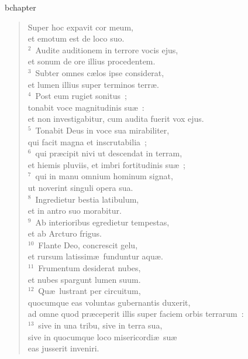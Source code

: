 bchapter\begin{flushleft}\begin{verse}\vspace{-19pt}\hspace{6pt}Super hoc expavit cor meum,\\\hspace{6pt} et emotum est de loco suo.\\
${}^{2}$~Audite auditionem in terrore vocis ejus,\\ et sonum de ore illius procedentem.\\
${}^{3}$~Subter omnes c\ae los ipse considerat,\\ et lumen illius super terminos terr\ae .\\
${}^{4}$~Post eum rugiet sonitus~;\\ tonabit voce magnitudinis su\ae~:\\ et non investigabitur, cum audita fuerit vox ejus.\\
${}^{5}$~Tonabit Deus in voce sua mirabiliter,\\ qui facit magna et inscrutabilia~;\\
${}^{6}$~qui pr\ae cipit nivi ut descendat in terram,\\ et hiemis pluviis, et imbri fortitudinis su\ae~;\\
${}^{7}$~qui in manu omnium hominum signat,\\ ut noverint singuli opera sua.\\
${}^{8}$~Ingredietur bestia latibulum,\\ et in antro suo morabitur.\\
${}^{9}$~Ab interioribus egredietur tempestas,\\ et ab Arcturo frigus.\\
${}^{10}$~Flante Deo, concrescit gelu,\\ et rursum latissim\ae\ funduntur aqu\ae .\\
${}^{11}$~Frumentum desiderat nubes,\\ et nubes spargunt lumen suum.\\
${}^{12}$~Qu\ae\ lustrant per circuitum,\\ quocumque eas voluntas gubernantis duxerit,\\ ad omne quod pr\ae ceperit illis super faciem orbis terrarum~:\\
${}^{13}$~sive in una tribu, sive in terra sua,\\ sive in quocumque loco misericordi\ae\ su\ae \\ eas jusserit inveniri.\\

\end{verse}
\end{flushleft}
